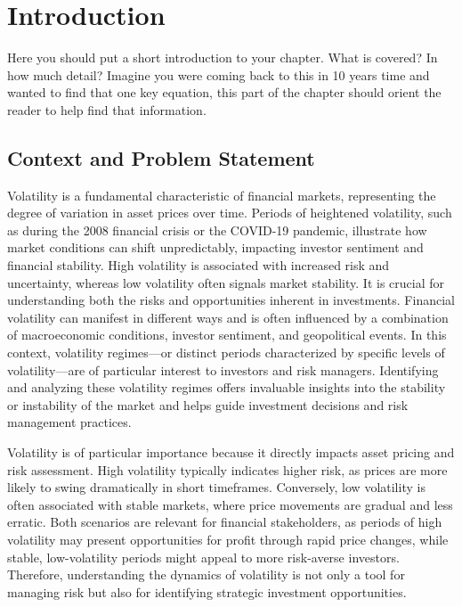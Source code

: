 \chapter{Introduction}
Here you should put a short introduction to your chapter. What is covered? In how much detail? Imagine you were coming back to this in 10 years time and wanted to find that one key equation, this part of the chapter should orient the reader to help find that information.

\section{Context and Problem Statement} \label{sec:sections}

Volatility is a fundamental characteristic of financial markets, representing the degree of variation in asset prices over time. Periods of heightened volatility, such as during the 2008 financial crisis or the COVID-19 pandemic, illustrate how market conditions can shift unpredictably, impacting investor sentiment and financial stability. High volatility is associated with increased risk and uncertainty, whereas low volatility often signals market stability. It is crucial for understanding both the risks and opportunities inherent in investments. Financial volatility can manifest in different ways and is often influenced by a combination of macroeconomic conditions, investor sentiment, and geopolitical events. In this context, volatility regimes—or distinct periods characterized by specific levels of volatility—are of particular interest to investors and risk managers. Identifying and analyzing these volatility regimes offers invaluable insights into the stability or instability of the market and helps guide investment decisions and risk management practices.

Volatility is of particular importance because it directly impacts asset pricing and risk assessment. High volatility typically indicates higher risk, as prices are more likely to swing dramatically in short timeframes. Conversely, low volatility is often associated with stable markets, where price movements are gradual and less erratic. Both scenarios are relevant for financial stakeholders, as periods of high volatility may present opportunities for profit through rapid price changes, while stable, low-volatility periods might appeal to more risk-averse investors. Therefore, understanding the dynamics of volatility is not only a tool for managing risk but also for identifying strategic investment opportunities.


